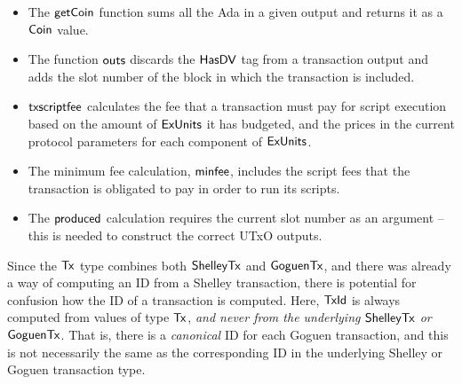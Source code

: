 \begin{itemize}

  \item The $\mathsf{getCoin}$ function sums all the Ada in a given output and returns it as a
  $\mathsf{Coin}$ value.

  \item The function $\mathsf{outs}$ discards the $\mathsf{HasDV}$ tag from a
  transaction output and adds the slot number of the block in which the transaction is
  included.

  \item $\mathsf{txscriptfee}$ calculates the fee that a transaction must pay for script
  execution based on the amount of $\mathsf{ExUnits}$ it has budgeted, and the prices in the current protocol parameters
  for each component of $\mathsf{ExUnits}$.

  \item The minimum fee calculation, $\mathsf{minfee}$, includes the script
  fees that the transaction is obligated to pay in order to run its scripts.

  \item The $\mathsf{produced}$ calculation requires the current slot number as an argument -- this is
  needed to construct the correct UTxO outputs.
\end{itemize}

Since the $\mathsf{Tx}$ type combines both $\mathsf{ShelleyTx}$ and $\mathsf{GoguenTx}$, and
there was already a way of computing an ID from a Shelley transaction, there
is potential for confusion how the ID of a transaction is
computed. Here, $\mathsf{TxId}$ is always computed from values of type $\mathsf{Tx}$,
\emph{and never from the underlying $\mathsf{ShelleyTx}$ or $\mathsf{GoguenTx}$}.  That is, there is a \emph{canonical} ID for each Goguen transaction,
and this is not necessarily the same as the corresponding ID in the underlying Shelley or Goguen transaction type.

